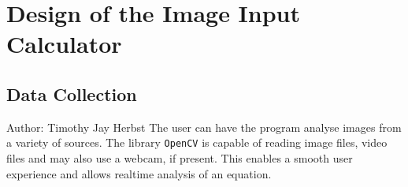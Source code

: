 \documentclass[12pt]{article}
\begin{document}
	
	\section{Design of the Image Input Calculator}
	
	\subsection{Data Collection}
	\small{Author: Timothy Jay Herbst} \newline \newline
	The user can have the program analyse images from a variety of sources.
	The library \texttt{OpenCV} is capable of reading image files, video files and may also use a webcam, if present.
	This enables a smooth user experience and allows realtime analysis of an equation.
	
	
	
\end{document}
